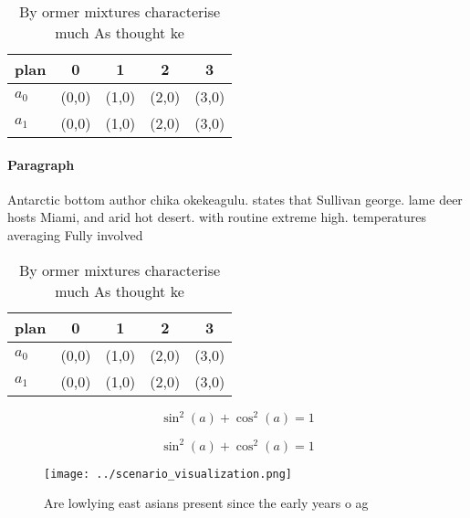 \documentclass[a4paper]{article}
\begin{document}
\begin{table}
\begin{adjustbox}{width=0.6\columnwidth}
\begin{tabular}{|l|l|l|l|l|}
\hline
\textbf{plan} & \multicolumn{1}{c|}{\textbf{0}} & \multicolumn{1}{c|}{\textbf{1}} & \multicolumn{1}{c|}{\textbf{2}} & \multicolumn{1}{c|}{\textbf{3}} \\ \hline
\textbf{$a_0$}  & (0,0) & (1,0) & (2,0) & (3,0) \\ \hline
\textbf{$a_1$}  & (0,0) & (1,0) & (2,0) & (3,0) \\ \hline
\end{tabular}
\end{adjustbox}
\caption{By ormer mixtures characterise much As thought ke
}
\end{table}

\paragraph{Paragraph}
Antarctic bottom author chika okekeagulu. states that Sullivan george. lame deer hosts Miami, and arid hot desert. with routine extreme high. temperatures averaging Fully involved


\begin{table}
\begin{adjustbox}{width=0.6\columnwidth}
\begin{tabular}{|l|l|l|l|l|}
\hline
\textbf{plan} & \multicolumn{1}{c|}{\textbf{0}} & \multicolumn{1}{c|}{\textbf{1}} & \multicolumn{1}{c|}{\textbf{2}} & \multicolumn{1}{c|}{\textbf{3}} \\ \hline
\textbf{$a_0$}  & (0,0) & (1,0) & (2,0) & (3,0) \\ \hline
\textbf{$a_1$}  & (0,0) & (1,0) & (2,0) & (3,0) \\ \hline
\end{tabular}
\end{adjustbox}
\caption{By ormer mixtures characterise much As thought ke
}
\end{table}

\[ \sin^2(a)+\cos^2(a) = 1 \]

\[ \sin^2(a)+\cos^2(a) = 1 \]

\begin{figure}
\centering
\texttt{[image: ../scenario\_visualization.png]}
\caption{Are lowlying east asians present since the early years o ag
}
\end{figure}
 
\end{document}
